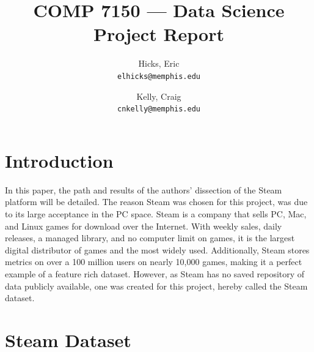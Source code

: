 \documentclass[letterpaper,10pt,twocolumn]{article}
\title{COMP 7150 --- Data Science Project Report}
\author{
    Hicks, Eric\\
    \texttt{elhicks@memphis.edu}
    \and
    Kelly, Craig\\
    \texttt{cnkelly@memphis.edu}
}
\begin{document}
\setlength{\pdfpageheight}{\paperheight}
\setlength{\pdfpagewidth}{\paperwidth}

\maketitle



\section{Introduction}

In this paper, the path and results of the authors' dissection of the Steam
platform will be detailed. The reason Steam was chosen for this project, was
due to its large acceptance in the PC space. Steam is a company that sells
PC, Mac, and Linux games for download over the Internet. With weekly sales,
daily releases, a managed library, and no computer limit on games, it is the
largest digital distributor of games and the most widely used. Additionally,
Steam stores metrics on over a 100 million users on nearly 10,000 games,
making it a perfect example of a feature rich dataset. However, as Steam has
no saved repository of data publicly available, one was created for this
project, hereby called the Steam dataset. \cite{steam}



\section{Steam Dataset}
\end{document}
